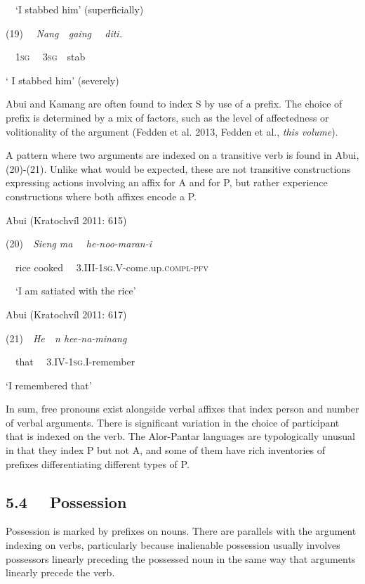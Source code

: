 \ \ {\textquoteleft}I stabbed him{\textquoteright} (superficially)\ \ \ \ 

(19)  \ \ \textit{Nang\ \ gaing \ \ diti.}

\ \ 1\textsc{sg} \ \ 3\textsc{sg}\ \ stab

{\textquoteleft} I stabbed him{\textquoteright} (severely)

Abui and Kamang are often found to index S by use of a prefix. The choice of prefix is determined by a mix of factors, such as the level of affectedness or volitionality of the argument (Fedden et al. 2013, Fedden et al., \textit{this volume}). 

A pattern where two arguments are indexed on a transitive verb is found in Abui, (20)-(21). Unlike what would be expected, these are not transitive constructions expressing actions involving an affix for A and for P, but rather experience constructions where both affixes encode a P. 

Abui (Kratochv\'il 2011: 615)

(20)\ \ \textit{Sieng ma \ \ he-noo-maran-i}

\ \ rice cooked \ \ 3.III-1\textsc{sg}.V-come.up.\textsc{compl-pfv}

\ \ {\textquoteleft}I am satiated with the rice{\textquoteright}

Abui (Kratochv\'il 2011: 617)

(21)\ \ \textit{He\ \ n hee-na-minang} 

\ \ that \ \ 3.IV-1\textsc{sg}.I-remember

{\textquoteleft}I remembered that{\textquoteright}

In sum, free pronouns exist alongside verbal affixes that index person and number of verbal arguments. There is significant variation in the choice of participant that is indexed on the verb. The Alor-Pantar languages are typologically unusual in that they index P but not A, and some of them have rich inventories of prefixes differentiating different types of P. 

\subsection[5.4 \ \ Possession]{5.4 \ \ Possession}
Possession is marked by prefixes on nouns. There are parallels with the argument indexing on verbs, particularly because inalienable possession usually involves possessors linearly preceding the possessed noun in the same way that arguments linearly precede the verb. 

